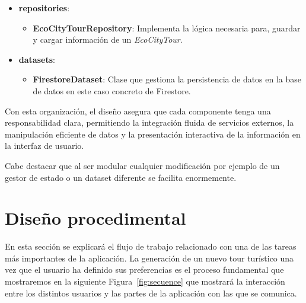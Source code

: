 \begin{itemize}
	\item \textbf{repositories}:
	\begin{itemize}
		\item \textbf{EcoCityTourRepository}: Implementa la lógica necesaria para, guardar y cargar información de un \textit{EcoCityTour}.
	\end{itemize}
	
	\item \textbf{datasets}:
	\begin{itemize}
		\item \textbf{FirestoreDataset}: Clase que gestiona la persistencia de datos en la base de datos en este caso concreto de Firestore.
	\end{itemize}
\end{itemize}

Con esta organización, el diseño asegura que cada componente tenga una responsabilidad clara, permitiendo la integración fluida de servicios externos, la manipulación eficiente de datos y la presentación interactiva de la información en la interfaz de usuario. 

Cabe destacar que al ser modular cualquier modificación por ejemplo de un gestor de estado o un dataset diferente se facilita enormemente.



\section{Diseño procedimental}
En esta sección se explicará el flujo de trabajo relacionado con una de las tareas más importantes de la aplicación.
La generación de un nuevo tour turístico una vez que el usuario ha definido sus preferencias es el proceso fundamental que mostraremos en la siguiente Figura~\ref{fig:secuence} que mostrará la interacción entre los distintos usuarios y las partes de la aplicación con las que se comunica.

